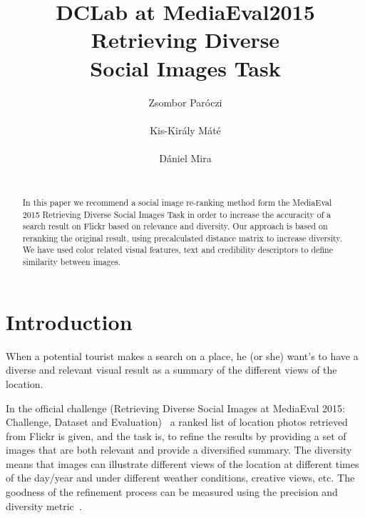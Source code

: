 \documentclass{sig-alternate}
\begin{document}

\title{DCLab at MediaEval2015 Retrieving Diverse \\ Social Images Task}


\author{
\alignauthor
Zsombor Par\'oczi\\
       \\
\alignauthor
Kis-Kir\'aly M\'at\'e \\
		\\
\alignauthor
D\'aniel Mira\\
		\\
}

\maketitle
\begin{abstract}
In this paper we recommend a social image re-ranking method form the MediaEval 2015 Retrieving Diverse Social Images Task in order to increase the accuracity of a search result on Flickr based on relevance and diversity. Our approach is based on reranking the original result, using precalculated distance matrix to increase diversity. We have used color related visual features, text and credibility descriptors to define similarity between images.
\end{abstract}

\section{Introduction}

When a potential tourist makes a search on a place, he (or she) want's to have a diverse and relevant visual result as a summary of the different views of the location. 

In the official challenge (Retrieving Diverse Social Images at MediaEval 2015: Challenge, Dataset and Evaluation)~\cite{Task2015} a ranked list of location photos retrieved from Flickr is given, and the task is, to refine the results by providing a set of images that are both relevant and provide a diversified summary. The diversity means that images can illustrate different views of the location at different times of the day/year and under different weather conditions, creative views, etc. The goodness of the refinement process can be measured using the precision and diversity metric~\cite{Taneva:2010:GRP:1718487.1718541}. 
\end{document}
